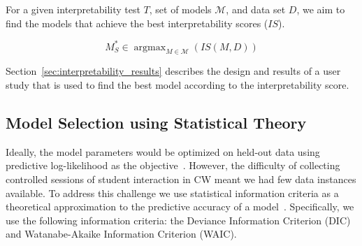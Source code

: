 \documentclass[letterpaper]{article} %
\newcommand{\citename}[1]{\citeauthor{#1}~\shortcite{#1}}
\DeclareMathOperator{\argmax}{argmax}
\newcommand{\kibitz}[2]{\ifnum\Comments=1{\textcolor{#1}{#2}}\fi}
\newcommand{\nh}[1]{\kibitz{blue}{[NH:#1]}}
\begin{document}
For a given interpretability test $T$,  set of models $\mathcal{M}$, and data set $D$, we aim to find the models that achieve the best interpretability scores ($IS$).

\begin{equation}
    \label{eq:model_int_score}
    M^*_S \in \argmax_{M \in \mathcal{M}}(IS(M, D))
\end{equation}

Section~\ref{sec:interpretability_results} describes the design and results of a  user study that is
used to find the best model according to the interpretability score.




\subsection{Model Selection using Statistical Theory}
\label{sec:baseline}

Ideally, the model parameters would be optimized on held-out data using predictive log-likelihood as the objective~\cite{chang2009reading}.
However, the difficulty of collecting controlled sessions of student interaction in CW meant we had few data instances available.
To address this challenge we use  statistical information criteria as a theoretical approximation to the predictive accuracy of a model~\cite{gelman2013bayesian}. Specifically, we use the following information criteria:
the {Deviance Information Criterion (DIC)} and {Watanabe-Akaike Information Criterion (WAIC)}.
\end{document}
